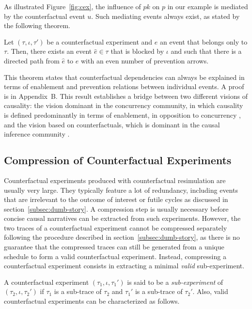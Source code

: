 As illustrated Figure~\ref{fig:cex}, the influence of $pk$ on $p$ in
our example is mediated by the counterfactual event $u$. Such
mediating events always exist, as stated by the following theorem.

\begin{theorem}
  \label{thm:completeness}
  Let $(\tau, \iota, \tau')$ be a counterfactual experiment and $e$ an
  event that belongs only to $\tau$. Then, there exists an event
  $\hat e \in \tau$ that is blocked by $\iota$ and such that there is a directed
  path from $\hat e$ to $e$ with an even number of prevention arrows.
\end{theorem}
\noindent This theorem states that counterfactual dependencies can always be
explained in terms of enablement and prevention relations between individual
events. A proof is in Appendix~B.
This result establishes a
bridge between two different visions of causality: the vision dominant in the
concurrency community, in which causality is defined predominantly in terms of
enablement, in opposition to concurrency  \cite{winskel1986event}, and the
vision based on counterfactuals, which is dominant in the causal inference
community \cite{pearl2009causality}.

\subsection{Compression of Counterfactual Experiments}

Counterfactual experiments produced with counterfactual resimulation
are usually very large. They typically feature a lot of redundancy,
including events that are irrelevant to the outcome of interest or
futile cycles as discussed in section~\ref{subsec:dumb-story}. A
compression step is usually necessary before concise causal narratives
can be extracted from such experiments. However, the two traces of a
counterfactual experiment cannot be compressed separately following
the procedure described in section~\ref{subsec:dumb-story}, as there
is no guarantee that the compressed traces can still be generated from
a unique schedule to form a valid counterfactual experiment. Instead,
compressing a counterfactual experiment consists in extracting a
minimal \emph{valid} sub-experiment.

A counterfactual experiment $(\tau_1, \iota, \tau_1')$ is said to be a
\emph{sub-experiment} of $(\tau_2, \iota, \tau_2')$ if $\tau_1$ is a
sub-trace of $\tau_2$ and $\tau_1'$ is a sub-trace of $\tau_2'$. Also,
valid counterfactual experiments can be characterized as follows.

